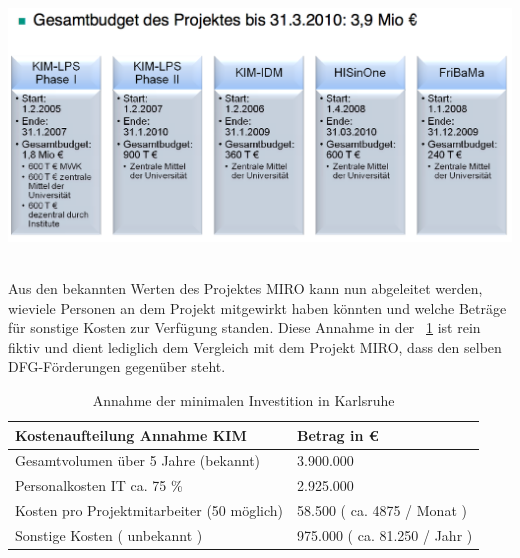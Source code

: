 \documentclass[a4paper]{article}
\makeatletter
\newcommand\captionof[1]{\def\@captype{#1}\caption}
\makeatother
\begin{document}
{\centering \includegraphics[width=15.425cm,height=7.153cm]{INMAusarbeitung02-img013.png}
\captionof{figure}[Überblick zum Projekt{}-Budget KIM (Juling Best Practice Workshop 2008)]{Überblick zum Projekt-Budget
KIM \textcolor[rgb]{1.0,0.2,0.2}{(}\textcolor{red}{Juling Best Practice Workshop 2008)}}
\par}
{\sffamily
Aus den bekannten Werten des Projektes MIRO kann nun abgeleitet werden, wieviele Personen an dem Projekt mitgewirkt
haben könnten und welche Beträge für sonstige Kosten zur Verfügung standen. Diese Annahme in der
\textcolor[rgb]{0.6,0.0,1.0}{\tablename~\ref{seq:refTable10}} ist rein fiktiv und dient lediglich dem Vergleich mit dem
Projekt MIRO, dass den selben DFG-Förderungen gegenüber steht.}


\bigskip

\begin{table}
\centering
\begin{tabular}{|m{7.4550004cm}|m{5.065cm}|}

\hline
{\sffamily\bfseries\color{black} Kostenaufteilung Annahme KIM} &
{\sffamily\bfseries\color{black} Betrag in €}\\\hline
{\sffamily\color{black} Gesamtvolumen über 5 Jahre (bekannt)} &
{\sffamily\color{black} 3.900.000}\\\hline
{\sffamily\color{black} Personalkosten IT ca. 75 \%} &
{\sffamily\color{black} 2.925.000}\\\hline
{\sffamily\color{black} Kosten pro Projektmitarbeiter (50 möglich)} &
{\sffamily\color{black} 58.500 ( ca. 4875 / Monat )}\\\hline
{\sffamily\color{black} Sonstige Kosten ( unbekannt )} &
{\sffamily\color{black} 975.000 ( ca. 81.250 / Jahr )}\\\hline\end{tabular}
\caption{Annahme der minimalen Investition in Karlsruhe}
\label{seq:refTable10}
\end{table}
\end{document}
